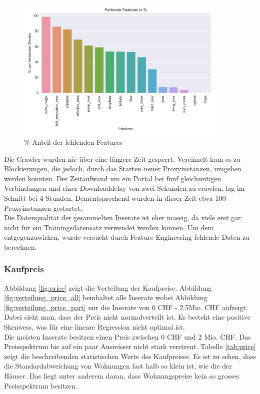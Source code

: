 \begin{figure}[h!]
\centering
\includegraphics[width=0.9\textwidth]{images/missing_values.png}
\caption[\% Anteil der fehlenden Features]{\% Anteil der fehlenden Features}%
\label{fig:features}
\end{figure}

Die Crawler wurden nie über eine längere Zeit gesperrt. Vereinzelt kam es zu Blockierungen, die jedoch, durch das Starten neuer Proxyinstanzen, umgehen werden konnten. Der Zeitaufwand um ein Portal bei fünf gleichzeitigen Verbindungen und einer Downloaddelay von zwei Sekunden zu crawlen, lag im Schnitt bei 4 Stunden. Dementsprechend wurden in dieser Zeit etwa 100 Proxyinstanzen gestartet.\\[2ex]
%
Die Datenqualität der gesammelten Inserate ist eher mässig, da viele erst gar nicht für ein Trainingsdatensatz verwendet werden können. Um dem entgegenzuwirken, wurde versucht durch Feature Engineering fehlende Daten zu berechnen.

\subsubsection{Kaufpreis}
Abbildung \ref{fig:price} zeigt die Verteilung der Kaufpreise. Abbildung \ref{fig:verteilung_price_all} beinhaltet alle Inserate wobei Abbildung \ref{fig:verteilung_price_part} nur die Inserate von 0 CHF - 2.5Mio. CHF aufzeigt. Dabei sieht man, dass der Preis nicht normalverteilt ist. Es besteht eine positive Skenwess, was für eine lineare Regression nicht optimal ist.\\
Die meisten Inserate besitzen einen Preis zwischen 0 CHF und 2 Mio. CHF. Das Preisspektrum bis auf ein paar Ausreisser nicht stark verstreut.
Tabelle \ref{tab:price} zeigt die beschreibenden statistischen Werte des Kaufpreises. Es ist zu sehen, dass die Standardabweichung von Wohnungen fast halb so klein ist, wie die der Häuser. Das liegt unter anderem daran, dass Wohnungspreise kein so grosses Preisspektrum besitzen.

